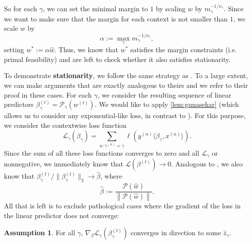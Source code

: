 \documentclass{article}
\theoremstyle{plain}
\theoremstyle{definition}
\newtheorem{assumption}[theorem]{Assumption}
\theoremstyle{remark}
\begin{document}
So for each $\gamma$, we can set the minimal margin to $1$ by scaling $w$ by $m_{\gamma}^{-1/\nu_{\gamma}}$.
Since we want to make sure that the margin for each context is not smaller than $1$, we scale $w$ by
\begin{equation}
    \alpha:=\max_{\gamma}m_{\gamma}^{-1/\nu_{\gamma}},
\end{equation}
setting $w^{\ast}:=\alpha\hat{w}$.
Thus, we know that $w^{\ast}$ satisfies the margin constraints (i.e. primal feasibility) and are left to check whether it also satisfies stationarity.

To demonstrate \textbf{stationarity}, we follow the same strategy as \citet{gunasekar_implicit_2018}.
To a large extent, we can make arguments that are exactly analogous to theirs and we refer to their proof in these cases.
For each $\gamma$, we consider the resulting sequence of linear predictors $\beta_{\gamma}^{(t)}=\mathcal{P}_{\gamma}(w^{(t)})$.
We would like to apply \cref{lem:gunasekar} (which allows us to consider any exponential-like loss, in contrast to \citet{gunasekar_implicit_2018}).
For this purpose, we consider the contextwise loss function
\begin{equation}
    \mathcal{L}_{\gamma}(\beta_{\gamma})=\sum_{n:\gamma^{(n)}=\gamma}\ell(y^{(n)}\langle\beta_{\gamma},x^{(n)}\rangle).
\end{equation}
Since the sum of all these loss functions converges to zero and all $\mathcal{L}_{\gamma}$ or nonnegative, we immediately know that $\mathcal{L}(\beta^{(t)})\to 0$.
Analogous to \citet{gunasekar_implicit_2018}, we also know that $\beta_{\gamma}^{(t)}/\|\beta^{(t)}_{\gamma}\|_2\to\hat{\beta}$, where
\begin{equation}
    \hat{\beta}:=\frac{\mathcal{P}(\hat{w})}{\left\|\mathcal{P}(\hat{w})\right\|}.
\end{equation}
All that is left is to exclude pathological cases where the gradient of the loss in the linear predictor does not converge:

\begin{assumption}
\label{ass:beta-gradient}
For all $\gamma$, $\nabla_{\beta}\mathcal{L}_{\gamma}(\beta_{\gamma}^{(t)})$ converges in direction to some $\hat{z}_{\gamma}$.
\end{assumption}
\end{document}
